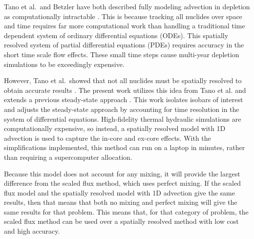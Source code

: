 \documentclass{style/nseJournal}
\begin{document}
Tano et al.\ and Betzler have both described fully modeling advection in depletion as computationally intractable \cite{tanocoupled2023, betzler_liquid-fueled_2021}.
This is because tracking all nuclides over space and time requires far more computational work than handling a traditional time dependent system of ordinary differential equations (ODEs).
This spatially resolved system of partial differential equations (PDEs) requires accuracy in the short time scale flow effects.
These small time steps cause multi-year depletion simulations to be exceedingly expensive.



However, Tano et al.\ showed that not all nuclides must be spatially resolved to obtain accurate results \cite{tanocoupled2023}.
The present work utilizes this idea from Tano et al. and extends a previous steady-state approach \cite{shahbazi_steady-state_2022}.
This work isolates isobars of interest and adjusts the steady-state approach by accounting for time resolution in the system of differential equations.
High-fidelity thermal hydraulic simulations are computationally expensive, so instead, a spatially resolved model with 1D advection is used to capture the in-core and ex-core effects.
With the simplifications implemented, this method can run on a laptop in minutes, rather than requiring a supercomputer allocation.

Because this model does not account for any mixing, it will provide the largest difference from the scaled flux method, which uses perfect mixing.
If the scaled flux model and the spatially resolved model with 1D advection give the same results, then that means that both no mixing and perfect mixing will give the same results for that problem.
This means that, for that category of problem, the scaled flux method can be used over a spatially resolved method with low cost and high accuracy.
\end{document}
